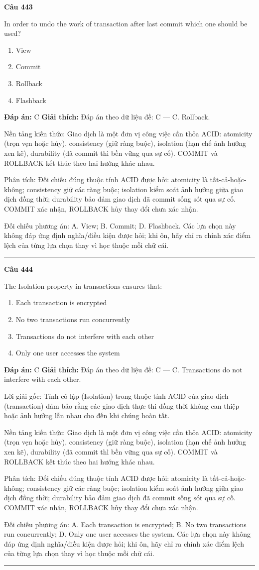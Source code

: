 \documentclass[11pt,a4paper]{article}
\newenvironment{question}[1]{%
  \par\vspace{1em}\noindent\textbf{\large Câu #1}\par\vspace{0.4em}
}{%
  \par\vspace{1em}\hrule\vspace{0.6em}
}
\newenvironment{choices}{%
  \begin{enumerate}[label=\textbf{\Alph*.},leftmargin=2.2em,itemsep=2pt,topsep=3pt]
}{%
  \end{enumerate}
}
\newcommand{\choice}{\item}
\begin{document}
\begin{question}{443}
In order to undo the work of transaction after last commit which one should be used?
\begin{choices}
\choice View
\choice Commit
\choice Rollback
\choice Flashback
\end{choices}
\textbf{Đáp án:} C
\textbf{Giải thích:} Đáp án theo dữ liệu đề: C — C. Rollback.

Nền tảng kiến thức: Giao dịch là một đơn vị công việc cần thỏa ACID: atomicity (trọn vẹn hoặc hủy), consistency (giữ ràng buộc), isolation (hạn chế ảnh hưởng xen kẽ), durability (đã commit thì bền vững qua sự cố). COMMIT và ROLLBACK kết thúc theo hai hướng khác nhau.

Phân tích: Đối chiếu đúng thuộc tính ACID được hỏi: atomicity là tất-cả-hoặc-không; consistency giữ các ràng buộc; isolation kiểm soát ảnh hưởng giữa giao dịch đồng thời; durability bảo đảm giao dịch đã commit sống sót qua sự cố. COMMIT xác nhận, ROLLBACK hủy thay đổi chưa xác nhận.

Đối chiếu phương án: A. View; B. Commit; D. Flashback. Các lựa chọn này không đáp ứng định nghĩa/điều kiện được hỏi; khi ôn, hãy chỉ ra chính xác điểm lệch của từng lựa chọn thay vì học thuộc mỗi chữ cái.
\end{question}

\begin{question}{444}
The Isolation property in transactions ensures that:
\begin{choices}
\choice Each transaction is encrypted
\choice No two transactions run concurrently
\choice Transactions do not interfere with each other
\choice Only one user accesses the system
\end{choices}
\textbf{Đáp án:} C
\textbf{Giải thích:} Đáp án theo dữ liệu đề: C — C. Transactions do not interfere with each other.

Lời giải gốc: Tính cô lập (Isolation) trong thuộc tính ACID của giao dịch (transaction) đảm bảo rằng các giao dịch thực thi đồng thời không can thiệp hoặc ảnh hưởng lẫn nhau cho đến khi chúng hoàn tất.

Nền tảng kiến thức: Giao dịch là một đơn vị công việc cần thỏa ACID: atomicity (trọn vẹn hoặc hủy), consistency (giữ ràng buộc), isolation (hạn chế ảnh hưởng xen kẽ), durability (đã commit thì bền vững qua sự cố). COMMIT và ROLLBACK kết thúc theo hai hướng khác nhau.

Phân tích: Đối chiếu đúng thuộc tính ACID được hỏi: atomicity là tất-cả-hoặc-không; consistency giữ các ràng buộc; isolation kiểm soát ảnh hưởng giữa giao dịch đồng thời; durability bảo đảm giao dịch đã commit sống sót qua sự cố. COMMIT xác nhận, ROLLBACK hủy thay đổi chưa xác nhận.

Đối chiếu phương án: A. Each transaction is encrypted; B. No two transactions run concurrently; D. Only one user accesses the system. Các lựa chọn này không đáp ứng định nghĩa/điều kiện được hỏi; khi ôn, hãy chỉ ra chính xác điểm lệch của từng lựa chọn thay vì học thuộc mỗi chữ cái.
\end{question}
\end{document}
